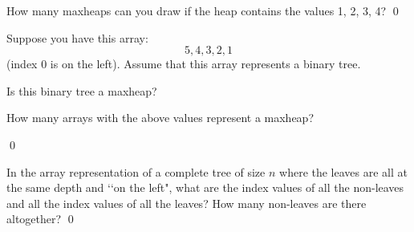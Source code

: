 \newpage
\begin{ex}
How many maxheaps can you draw if the heap contains
the values 1, 2, 3, 4?
\qed
\end{ex}


\newpage
\begin{ex}
Suppose you have this array:
\[
5, 4, 3, 2, 1
\]
(index 0 is on the left).
Assume that this array represents a binary tree.
\begin{tightlist}
  \item Is this binary tree a maxheap?
  \item How many arrays with the above values represent a maxheap?
\end{tightlist}
\qed
\end{ex}

\newpage
\begin{ex}
  In the array representation of a complete tree of size $n$ where
  the leaves are all at the same depth and \lq\lq on the left",
  what are the index values of all the non-leaves
  and all the index values of all the leaves?
  How many non-leaves are there altogether?
  \qed
\end{ex}
